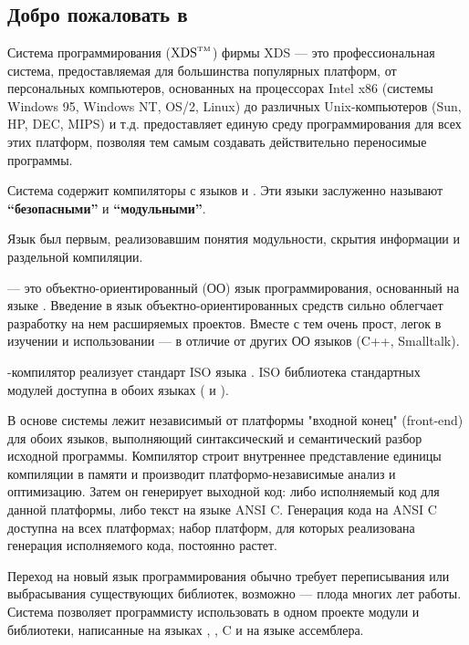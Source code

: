 \chapter{\XDS}

\section{Добро пожаловать в \XDS}

Система программирования ($\mbox{XDS}^{\mbox{\tiny TM}}$) фирмы XDS --- это
профессиональная система, предоставляемая для большинства популярных
платформ, от персональных компьютеров, основанных на процессорах
Intel x86 (системы Windows 95, Windows NT, OS/2, Linux)
до различных Unix-компьютеров (Sun, HP, DEC, MIPS) и т.д. 
\xds{} предоставляет единую среду программирования для всех этих
платформ, позволяя тем самым создавать действительно переносимые
программы.

Система содержит компиляторы с языков \mt{} и \ot{}. 
Эти языки заслуженно называют {\bf ``безопасными''} и {\bf ``модульными''}. 

Язык \mt{} был первым, реализовавшим понятия модульности,
скрытия информации %
и раздельной компиляции.

\ot{} --- это объектно-ориентированный (ОО) язык программирования,
основанный на языке \mt. Введение в язык объектно-ориентированных средств
сильно облегчает разработку на нем расширяемых проектов. Вместе с тем
\ot{} очень прост, легок в изучении и использовании --- в отличие от 
других ОО языков (C++, Smalltalk).

\xds{} \mt{}-компилятор реализует стандарт ISO языка \mt{}.
ISO библиотека стандартных модулей доступна в обоих языках
(\mt{} и \ot{}).

В основе системы \xds{} лежит независимый от платформы "входной конец"
(front-end) для обоих языков, выполняющий синтаксический и семантический
разбор исходной программы. Компилятор строит внутреннее представление
единицы компиляции в памяти и производит платформо-независимые
анализ и оптимизацию. Затем он генерирует выходной код: либо 
исполняемый код для данной платформы, либо текст на языке ANSI C.
Генерация кода на ANSI C доступна на всех платформах; набор платформ,
для которых реализована генерация исполняемого кода, постоянно растет.

Переход на новый язык программирования обычно требует переписывания
или выбрасывания существующих библиотек, возможно --- плода многих лет
работы.
Система \xds{} позволяет программисту использовать  в одном проекте
модули и библиотеки, написанные на языках \mt{}, \ot{}, C и на 
языке ассемблера.

